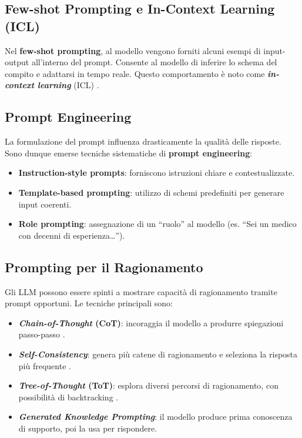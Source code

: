\subsection{Few-shot Prompting e In-Context Learning (ICL)}
Nel \textbf{few-shot prompting}, al modello vengono forniti alcuni esempi 
di input-output all'interno del prompt. Consente al modello di inferire lo schema del compito e adattarsi in tempo reale.
Questo comportamento è noto come \textbf{\textit{in-context learning}} (ICL) \cite{dong2023survey}.

\subsection{Prompt Engineering}
La formulazione del prompt influenza drasticamente la qualità delle risposte.
Sono dunque emerse tecniche sistematiche di \textbf{prompt engineering}:
\begin{itemize}
    \item \textbf{Instruction-style prompts}: forniscono istruzioni chiare e contestualizzate.
    \item \textbf{Template-based prompting}: utilizzo di schemi predefiniti per generare input coerenti.
    \item \textbf{Role prompting}: assegnazione di un “ruolo” al modello (es. “Sei un medico con decenni di esperienza…”).
\end{itemize}

\subsection{Prompting per il Ragionamento}
Gli LLM possono essere spinti a mostrare capacità di ragionamento tramite prompt opportuni.
Le tecniche principali sono:
\begin{itemize}
    \item \textbf{\textit{Chain-of-Thought} (CoT)}: incoraggia il modello a produrre spiegazioni passo-passo \cite{wei2022chain}.
    \item \textbf{\textit{Self-Consistency}}: genera più catene di ragionamento e seleziona la risposta più frequente \cite{wang2022selfconsistency}.
    \item \textbf{\textit{Tree-of-Thought} (ToT)}: esplora diversi percorsi di ragionamento, con possibilità di backtracking \cite{yao2023tree}.
    \item \textbf{\textit{Generated Knowledge Prompting}}: il modello produce prima conoscenza di supporto, poi la usa per rispondere.
\end{itemize}

